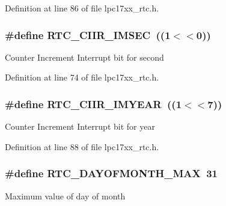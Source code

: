 \-Definition at line 86 of file lpc17xx\-\_\-rtc.\-h.

\hypertarget{group___r_t_c___private___macros_gae3ce6f77e52bc9e0522d1800f617c3fc}{
\subsubsection[{\-R\-T\-C\-\_\-\-C\-I\-I\-R\-\_\-\-I\-M\-S\-E\-C}]{\setlength{\rightskip}{0pt plus 5cm}\#define {\bf \-R\-T\-C\-\_\-\-C\-I\-I\-R\-\_\-\-I\-M\-S\-E\-C}~((1$<$$<$0))}}\label{group___r_t_c___private___macros_gae3ce6f77e52bc9e0522d1800f617c3fc}
\-Counter \-Increment \-Interrupt bit for second 

\-Definition at line 74 of file lpc17xx\-\_\-rtc.\-h.

\hypertarget{group___r_t_c___private___macros_gace884731c6a8cbc67da8d6d3a460ea0b}{
\subsubsection[{\-R\-T\-C\-\_\-\-C\-I\-I\-R\-\_\-\-I\-M\-Y\-E\-A\-R}]{\setlength{\rightskip}{0pt plus 5cm}\#define {\bf \-R\-T\-C\-\_\-\-C\-I\-I\-R\-\_\-\-I\-M\-Y\-E\-A\-R}~((1$<$$<$7))}}\label{group___r_t_c___private___macros_gace884731c6a8cbc67da8d6d3a460ea0b}
\-Counter \-Increment \-Interrupt bit for year 

\-Definition at line 88 of file lpc17xx\-\_\-rtc.\-h.

\hypertarget{group___r_t_c___private___macros_gaddd515ae325f802e35e8202fef5f2957}{
\subsubsection[{\-R\-T\-C\-\_\-\-D\-A\-Y\-O\-F\-M\-O\-N\-T\-H\-\_\-\-M\-A\-X}]{\setlength{\rightskip}{0pt plus 5cm}\#define {\bf \-R\-T\-C\-\_\-\-D\-A\-Y\-O\-F\-M\-O\-N\-T\-H\-\_\-\-M\-A\-X}~31}}\label{group___r_t_c___private___macros_gaddd515ae325f802e35e8202fef5f2957}
\-Maximum value of day of month 

